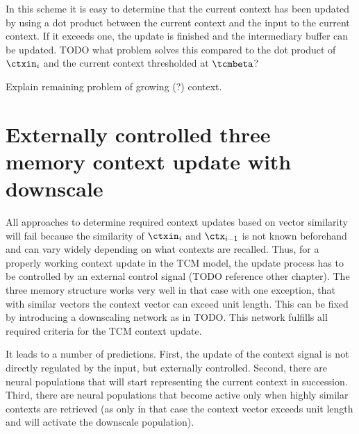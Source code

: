 In this scheme it is easy to determine that the current context has been updated by using a dot product between the current context and the input to the current context.
If it exceeds one, the update is finished and the intermediary buffer can be updated.
TODO what problem solves this compared to the dot product of $\ctxin_i$ and the current context thresholded at $\tcmbeta$?

Explain remaining problem of growing (?) context.

\section{Externally controlled three memory context update with downscale}
All approaches to determine required context updates based on vector similarity will fail because the similarity of $\ctxin_i$ and $\ctx_{i-1}$ is not known beforehand and can vary widely depending on what contexts are recalled.
Thus, for a properly working context update in the TCM model, the update process has to be controlled by an external control signal (TODO reference other chapter).
The three memory structure works very well in that case with one exception, that with similar vectors the context vector can exceed unit length.
This can be fixed by introducing a downscaling network as in TODO\@.
This network fulfills all required criteria for the TCM context update.

It leads to a number of predictions.
First, the update of the context signal is not directly regulated by the input, but externally controlled. Second, there are neural populations that will start representing the current context in succession. Third, there are neural populations that become active only when highly similar contexts are retrieved (as only in that case the context vector exceeds unit length and will activate the downscale population).
